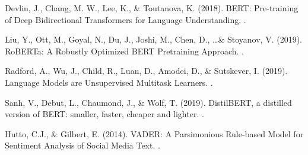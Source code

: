 \documentclass{article}
\begin{document}
\begin{thebibliography}{}

    Devlin, J., Chang, M. W., Lee, K., \& Toutanova, K. (2018). \newblock BERT:
    Pre-training of Deep Bidirectional Transformers for Language Understanding.
    .

    Liu, Y., Ott, M., Goyal, N., Du, J., Joshi, M., Chen, D., \ldots \&
    Stoyanov, V. (2019). \newblock RoBERTa: A Robustly Optimized BERT Pretraining
    Approach. .

    Radford, A., Wu, J., Child, R., Luan, D., Amodei, D., \& Sutskever, I.
    (2019). \newblock Language Models are Unsupervised Multitask Learners.
    .

    Sanh, V., Debut, L., Chaumond, J., \& Wolf, T. (2019). \newblock
    DistilBERT, a distilled version of BERT: smaller, faster, cheaper and lighter.
    .

    Hutto, C.J., \& Gilbert, E. (2014). \newblock VADER: A Parsimonious
    Rule-based Model for Sentiment Analysis of Social Media Text. .

\end{thebibliography}

\thispagestyle{empty}
\end{document}
